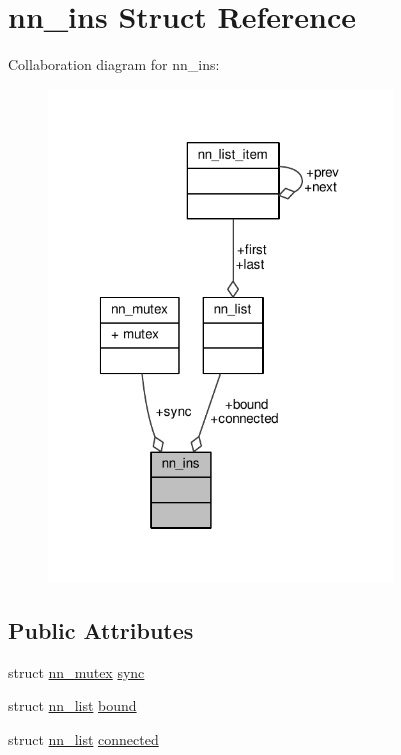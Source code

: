 \hypertarget{structnn__ins}{}\section{nn\+\_\+ins Struct Reference}
\label{structnn__ins}


Collaboration diagram for nn\+\_\+ins\+:\nopagebreak
\begin{figure}[H]
\begin{center}
\leavevmode
\includegraphics[width=259pt]{structnn__ins__coll__graph}
\end{center}
\end{figure}
\subsection*{Public Attributes}
\begin{DoxyCompactItemize}
\item 
struct \hyperlink{structnn__mutex}{nn\+\_\+mutex} \hyperlink{structnn__ins_a63ed8c2cce745f6dca202806f1db7301}{sync}
\item 
struct \hyperlink{structnn__list}{nn\+\_\+list} \hyperlink{structnn__ins_ad379fd9cffdbb9be945cab8bfeb01e9e}{bound}
\item 
struct \hyperlink{structnn__list}{nn\+\_\+list} \hyperlink{structnn__ins_a4b077905ad4f7970d6c67613daea6988}{connected}
\end{DoxyCompactItemize}


